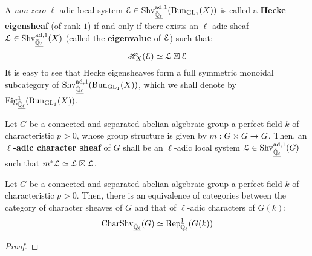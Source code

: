        \begin{definition} \label{def: hecke_eigensheaves}
            A \textit{non-zero} $\ell$-adic local system $\mathcal{E} \in \mathrm{Shv}_{\underline{\bar{\mathbb{Q}}_{\ell}}}^{\mathrm{ad}, 1}(\mathrm{Bun}_{\operatorname{GL}_1}(X))$ is called a \textbf{Hecke eigensheaf} (of rank $1$) if and only if there exists an $\ell$-adic sheaf $\mathcal{L} \in \mathrm{Shv}_{\underline{\bar{\mathbb{Q}}_{\ell}}}^{\mathrm{ad}, 1}(X)$ (called the \textbf{eigenvalue} of $\mathcal{E}$) such that:
                $$\mathscr{H}_X(\mathcal{E}) \simeq \mathcal{L} \boxtimes \mathcal{E}$$
            It is easy to see that Hecke eigensheaves form a full symmetric monoidal subcategory of $\mathrm{Shv}_{\underline{\bar{\mathbb{Q}}_{\ell}}}^{\mathrm{ad}, 1}(\mathrm{Bun}_{\operatorname{GL}_1}(X))$, which we shall denote by $\mathrm{Eig}_{\underline{\bar{\mathbb{Q}}_{\ell}}}^1(\mathrm{Bun}_{\operatorname{GL}_1}(X))$.
        \end{definition}
        
        \begin{definition} \label{def: character_sheaves}
            Let $G$ be a connected and separated abelian algebraic group a perfect field $k$ of characteristic $p > 0$, whose group structure is given by $m: G \x G \to G$. Then, an \textbf{$\ell$-adic character sheaf} of $G$ shall be an $\ell$-adic local system $\mathcal{L} \in \mathrm{Shv}_{\underline{\bar{\mathbb{Q}}_{\ell}}}^{\mathrm{ad}, 1}(G)$ such that $m^*\mathcal{L} \simeq \mathcal{L} \boxtimes \mathcal{L}$. 
        \end{definition}
        \begin{lemma} \label{lemma: character_sheav es_of_group_schemes_and_group_characters}
            Let $G$ be a connected and separated abelian algebraic group a perfect field $k$ of characteristic $p > 0$. Then, there is an equivalence of categories between the category of character sheaves of $G$ and that of $\ell$-adic characters of $G(k)$:
                $$\mathrm{Char}\mathrm{Shv}_{\underline{\bar{\mathbb{Q}}_{\ell}}}(G) \simeq \mathrm{Rep}^1_{\bar{\mathbb{Q}}_{\ell}}(G(k))$$
        \end{lemma}
            \begin{proof}
                
            \end{proof}
        
